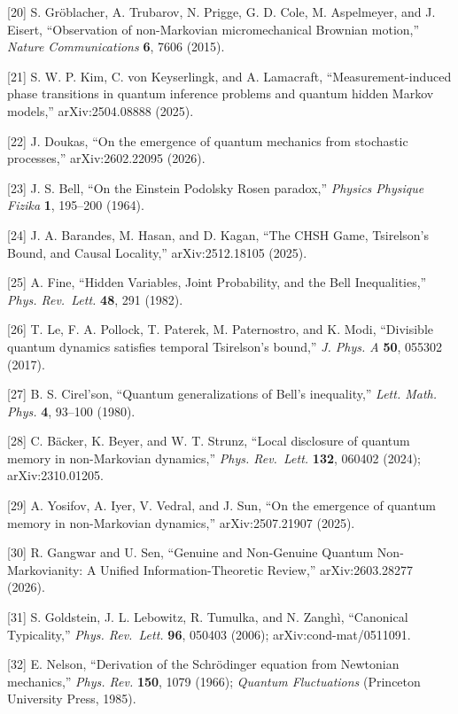 \documentclass[
]{article}
\begin{document}
{[}20{]} S. Gröblacher, A. Trubarov, N. Prigge, G. D. Cole, M.
Aspelmeyer, and J. Eisert, ``Observation of non-Markovian
micromechanical Brownian motion,'' \emph{Nature Communications}
\textbf{6}, 7606 (2015).

{[}21{]} S. W. P. Kim, C. von Keyserlingk, and A. Lamacraft,
``Measurement-induced phase transitions in quantum inference problems
and quantum hidden Markov models,'' arXiv:2504.08888 (2025).

{[}22{]} J. Doukas, ``On the emergence of quantum mechanics from
stochastic processes,'' arXiv:2602.22095 (2026).

{[}23{]} J. S. Bell, ``On the Einstein Podolsky Rosen paradox,''
\emph{Physics Physique Fizika} \textbf{1}, 195--200 (1964).

{[}24{]} J. A. Barandes, M. Hasan, and D. Kagan, ``The CHSH Game,
Tsirelson's Bound, and Causal Locality,'' arXiv:2512.18105 (2025).

{[}25{]} A. Fine, ``Hidden Variables, Joint Probability, and the Bell
Inequalities,'' \emph{Phys. Rev.~Lett.} \textbf{48}, 291 (1982).

{[}26{]} T. Le, F. A. Pollock, T. Paterek, M. Paternostro, and K. Modi,
``Divisible quantum dynamics satisfies temporal Tsirelson's bound,''
\emph{J. Phys. A} \textbf{50}, 055302 (2017).

{[}27{]} B. S. Cirel'son, ``Quantum generalizations of Bell's
inequality,'' \emph{Lett. Math. Phys.} \textbf{4}, 93--100 (1980).

{[}28{]} C. Bäcker, K. Beyer, and W. T. Strunz, ``Local disclosure of
quantum memory in non-Markovian dynamics,'' \emph{Phys. Rev.~Lett.}
\textbf{132}, 060402 (2024); arXiv:2310.01205.

{[}29{]} A. Yosifov, A. Iyer, V. Vedral, and J. Sun, ``On the emergence
of quantum memory in non-Markovian dynamics,'' arXiv:2507.21907 (2025).

{[}30{]} R. Gangwar and U. Sen, ``Genuine and Non-Genuine Quantum
Non-Markovianity: A Unified Information-Theoretic Review,''
arXiv:2603.28277 (2026).

{[}31{]} S. Goldstein, J. L. Lebowitz, R. Tumulka, and N. Zanghì,
``Canonical Typicality,'' \emph{Phys. Rev.~Lett.} \textbf{96}, 050403
(2006); arXiv:cond-mat/0511091.

{[}32{]} E. Nelson, ``Derivation of the Schrödinger equation from
Newtonian mechanics,'' \emph{Phys. Rev.} \textbf{150}, 1079 (1966);
\emph{Quantum Fluctuations} (Princeton University Press, 1985).
\end{document}
